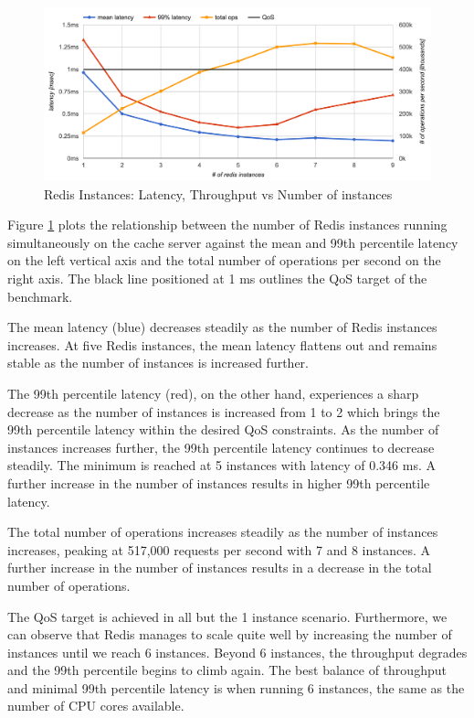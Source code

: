 \begin{figure}[h]
    \includegraphics[width=\textwidth]{./res/6_instances_latency_ops.png}
    \caption{Redis Instances: Latency, Throughput vs Number of instances}
    \label{fig:redis-instances-latency-ops}
\end{figure}

Figure \ref{fig:redis-instances-latency-ops} plots the relationship between the number of Redis instances running simultaneously on the cache server against the mean and 99th percentile latency on the left vertical axis and the total number of operations per second on the right axis. The black line positioned at 1 ms outlines the QoS target of the benchmark.

The mean latency (blue) decreases steadily as the number of Redis instances increases. At five Redis instances, the mean latency flattens out and remains stable as the number of instances is increased further.

The 99th percentile latency (red), on the other hand, experiences a sharp decrease as the number of instances is increased from 1 to 2 which brings the 99th percentile latency within the desired QoS constraints. As the number of instances increases further, the 99th percentile latency continues to decrease steadily. The minimum is reached at 5 instances with latency of 0.346 ms. A further increase in the number of instances results in higher 99th percentile latency.

The total number of operations increases steadily as the number of instances increases, peaking at 517,000 requests per second with 7 and 8 instances. A further increase in the number of instances results in a decrease in the total number of operations.




The QoS target is achieved in all but the 1 instance scenario. Furthermore, we can observe that Redis manages to scale quite well by increasing the number of instances until we reach 6 instances. Beyond 6 instances, the throughput degrades and the 99th percentile begins to climb again. The best balance of throughput and minimal 99th percentile latency is when running 6 instances, the same as the number of CPU cores available.

